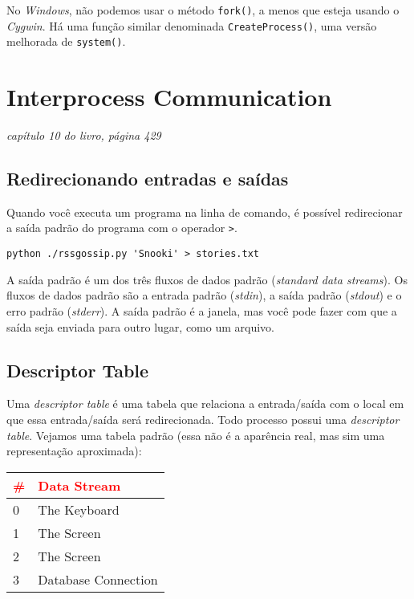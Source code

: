 \documentclass[12pt, a4paper]{article}
\begin{document}
No \textit{Windows}, não podemos usar o método \verb|fork()|, a menos que esteja usando o \textit{Cygwin}. Há uma função similar denominada \verb|CreateProcess()|, uma versão melhorada de \verb|system()|.

\section{Interprocess Communication}

\begin{flushright}
\textit{capítulo 10 do livro, página 429}
\end{flushright}

\subsection{Redirecionando entradas e saídas}

Quando você executa um programa na linha de comando, é possível redirecionar a saída padrão do programa com o operador \verb|>|.

\begin{verbatim}
python ./rssgossip.py 'Snooki' > stories.txt
\end{verbatim}

A saída padrão é um dos três fluxos de dados padrão (\textit{standard data streams}). Os fluxos de dados padrão são a entrada padrão (\textit{stdin}), a saída padrão (\textit{stdout}) e o erro padrão (\textit{stderr}). A saída padrão é a janela, mas você pode fazer com que a saída seja enviada para outro lugar, como um arquivo.

\subsection{Descriptor Table}

Uma \textit{descriptor table} é uma tabela que relaciona a entrada/saída com o local em que essa entrada/saída será redirecionada. Todo processo possui uma \textit{descriptor table}. Vejamos uma tabela padrão (essa não é a aparência real, mas sim uma representação aproximada):

\begin{table}[h]
\centering
\begin{tabular}{|l|l|}
\hline
\textcolor{red}{\#} & \textcolor{red}{Data Stream}         \\ \hline
0  & The Keyboard        \\ \hline
1  & The Screen          \\ \hline
2  & The Screen          \\ \hline
3  & Database Connection \\ \hline
\end{tabular}
\end{table}
\end{document}
